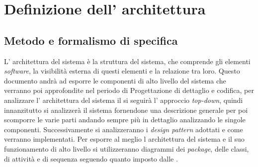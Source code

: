 \section{Definizione dell' architettura}
\subsection{Metodo e formalismo di specifica}
L' architettura del sistema è la struttura del sistema, che comprende gli elementi \textit{software}, la visibilità esterna di questi elementi e la relazione tra loro.
Questo documento andrà ad esporre le componenti di alto livello del sistema che verranno poi approfondite nel periodo di Progettazione di dettaglio e codifica, per analizzare l' architettura del sistema il \progetto si seguirà l' approccio \textit{top-down}, quindi innanzitutto si analizzerà il sistema fornendone una descrizione generale per poi scomporre le varie parti andando sempre più in dettaglio analizzando le singole componenti.
Successivamente si analizzeranno i \textit{design pattern} adottati e come verranno implementati.
Per esporre al meglio l architettura del sistema e il suo funzionamento di alto livello si utilizzeranno diagrammi dei \textit{package}, delle classi, di attività e di sequenza seguendo quanto imposto dalle \NormeDiProgetto{}.
